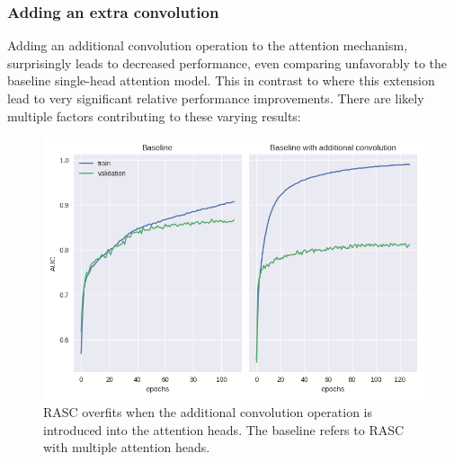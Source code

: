 
\subsubsection{Adding an extra convolution}
Adding an additional convolution operation to the attention mechanism, surprisingly leads to decreased performance, even comparing unfavorably to the baseline single-head attention model. This in contrast to \cite{ghentransformers} where this extension lead to very significant relative performance improvements. There are likely multiple factors contributing to these varying results:

\begin{figure}
	\centering\includegraphics[width=1\textwidth]{../visualizations/ch5-results/training_curve_conv_heads.png} 
	\caption{RASC overfits when the additional convolution operation is introduced into the attention heads. The baseline refers to RASC with multiple attention heads. }
	\label{fig:training_curve}
\end{figure}


